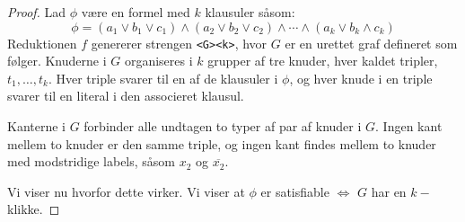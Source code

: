 \begin{proof}
  Lad $\phi$ være en formel med $k$ klausuler såsom:
  \begin{equation*}
\phi = (a_{1} \lor b_{1} \lor c_{1}) \land (a_{2} \lor b_{2} \lor c_{2}) \land \cdots \land (a_{k} \lor b_{k} \land c_{k})
  \end{equation*}
  Reduktionen $f$ genererer strengen \texttt{<G><k>}, hvor $G$ er en urettet graf defineret som følger.
  Knuderne i $G$ organiseres i $k$ grupper af tre knuder, hver kaldet tripler, $t_{1}, \ldots, t_{k}$. Hver triple svarer til en af de klausuler i $\phi$, og hver knude i en triple svarer til en literal i den associeret klausul.

  Kanterne i $G$ forbinder alle undtagen to typer af par af knuder i $G$. Ingen kant mellem to knuder er den samme triple, og ingen kant findes mellem to knuder med modstridige labels, såsom $x_{2}$ og $\overline{x_{2}}$.

  Vi viser nu hvorfor dette virker. Vi viser at $\phi$ er satisfiable $\iff$ $G$ har en $k-$klikke.

\end{proof}


